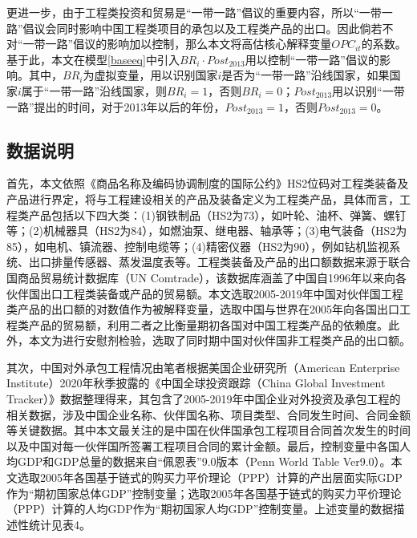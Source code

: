\documentclass[a4paper,12pt]{article}
\begin{document}
\vspace{0.5em}  %

更进一步，由于工程类投资和贸易是“一带一路”倡议的重要内容，所以“一带一路”倡议会同时影响中国工程类项目的承包以及工程类产品的出口。因此倘若不对“一带一路”倡议的影响加以控制，那么本文将高估核心解释变量${OPC}_{it}$的系数。基于此，本文在模型\ref{baseeq}中引入${BR}_i·{Post}_{2013}$用以控制“一带一路”倡议的影响。其中，${BR}_i$为虚拟变量，用以识别国家$i$是否为“一带一路”沿线国家，如果国家$i$属于“一带一路”沿线国家，则${BR}_i=1$，否则${BR}_i=0$；${Post}_{2013}$用以识别“一带一路”提出的时间，对于2013年以后的年份，${Post}_{2013}=1$，否则${Post}_{2013}=0$。


\subsection{数据说明}
首先，本文依照《商品名称及编码协调制度的国际公约》HS2位码对工程类装备及产品进行界定，将与工程建设相关的产品及装备定义为工程类产品，具体而言，工程类产品包括以下四大类：(1)钢铁制品（HS2为73），如叶轮、油杯、弹簧、螺钉等；(2)机械器具（HS2为84），如燃油泵、继电器、轴承等；(3)电气装备（HS2为85），如电机、镇流器、控制电缆等；(4)精密仪器（HS2为90），例如钻机监视系统、出口排量传感器、蒸发温度表等。工程类装备及产品的出口额数据来源于联合国商品贸易统计数据库（UN Comtrade），该数据库涵盖了中国自1996年以来向各伙伴国出口工程类装备或产品的贸易额。本文选取2005-2019年中国对伙伴国工程类产品的出口额的对数值作为被解释变量，选取中国与世界在2005年向各国出口工程类产品的贸易额，利用二者之比衡量期初各国对中国工程类产品的依赖度。此外，本文为进行安慰剂检验，选取了同时期中国对伙伴国非工程类产品的出口额。

\vspace{0.5em}  %

其次，中国对外承包工程情况由笔者根据美国企业研究所（American Enterprise Institute）2020年秋季披露的《中国全球投资跟踪（China Global Investment Tracker）》数据整理得来，其包含了2005-2019年中国企业对外投资及承包工程的相关数据，涉及中国企业名称、伙伴国名称、项目类型、合同发生时间、合同金额等关键数据。其中本文最关注的是中国在伙伴国承包工程项目合同首次发生的时间以及中国对每一伙伴国所签署工程项目合同的累计金额。最后，控制变量中各国人均GDP和GDP总量的数据来自“佩恩表”9.0版本（Penn World Table Ver9.0）。本文选取2005年各国基于链式的购买力平价理论（PPP）计算的产出层面实际GDP作为“期初国家总体GDP”控制变量；选取2005年各国基于链式的购买力平价理论（PPP）计算的人均GDP作为“期初国家人均GDP”控制变量。上述变量的数据描述性统计见表4。
\end{document}
